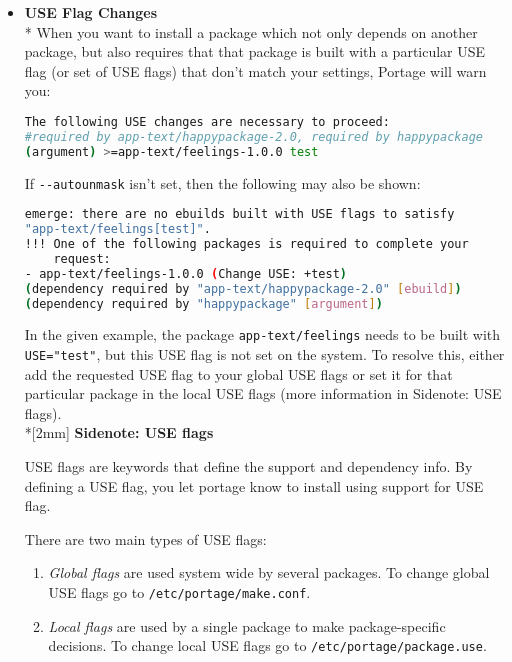 \documentclass[11pt]{article}
\begin{document}
\begin{itemize}
      \item \textbf{USE Flag Changes}
       \\* When you want to install a package which not only depends on another package, but also requires that that package is built with a particular USE flag (or set of USE flags) that don't match your settings, Portage will warn you: 
       \begin{lstlisting}[basicstyle=\ttfamily, backgroundcolor = \color{lightgray}, language = bash, xleftmargin = 0cm, framexleftmargin = 1em, framexrightmargin = 4em, showstringspaces=false]
The following USE changes are necessary to proceed:
#required by app-text/happypackage-2.0, required by happypackage 
(argument) >=app-text/feelings-1.0.0 test
\end{lstlisting}
       If \verb|--autounmask| isn't set, then the following may also be shown:
       \begin{lstlisting}[basicstyle=\ttfamily, backgroundcolor = \color{lightgray}, language = bash, xleftmargin = 0cm, framexleftmargin = 1em, framexrightmargin = 4em, showstringspaces=false]
emerge: there are no ebuilds built with USE flags to satisfy 
"app-text/feelings[test]".
!!! One of the following packages is required to complete your 
    request:
- app-text/feelings-1.0.0 (Change USE: +test)
(dependency required by "app-text/happypackage-2.0" [ebuild])
(dependency required by "happypackage" [argument])
\end{lstlisting}
       In the given example, the package \verb|app-text/feelings| needs to be built with \verb|USE="test"|, but this USE flag is not set on the system. To resolve this, either add the requested USE flag to your global USE flags or set it for that particular package in the local USE flags (more information in Sidenote: USE flags).
       \\*[2mm] \textbf{Sidenote: USE flags}

        USE flags are keywords that define the support and dependency info. By defining a USE flag, you let portage know to install using support for USE flag.

        There are two main types of USE flags:
        \begin{enumerate}
          \item \textit{Global flags} are used system wide by several packages. To change global USE flags go to \verb|/etc/portage/make.conf|.
          \item \textit{Local flags} are used by a single package to make package-specific decisions. To change local USE flags go to \verb|/etc/portage/package.use|.
        \end{enumerate}


\end{itemize}
\end{document}
